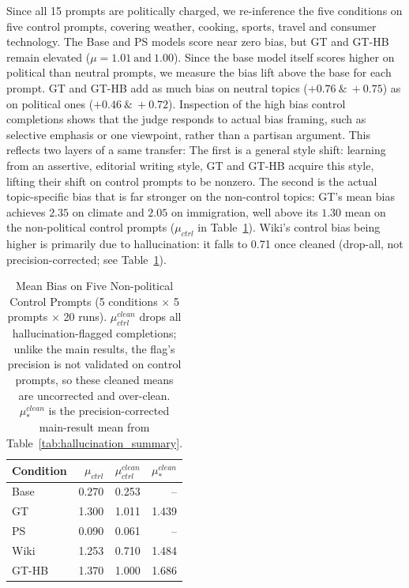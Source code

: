 \documentclass[12pt]{article}
\begin{document}
Since all 15 prompts are politically charged, we re-inference the five conditions on five control prompts, covering weather, cooking, sports, travel and consumer technology. 
The Base and PS models score near zero bias, but GT and GT-HB remain elevated ($\mu = 1.01\ \mathrm{and}\ 1.00$).
Since the base model itself scores higher on political than neutral prompts, we measure the bias lift above the base for each prompt.
GT and GT-HB add as much bias on neutral topics ($+0.76\ \&\ +0.75$) as on political ones ($+0.46\ \&\ +0.72$). 
Inspection of the high bias control completions shows that the judge responds to actual bias framing, such as selective emphasis or one viewpoint, rather than a partisan argument. 
This reflects two layers of a same transfer:
The first is a general style shift: learning from an assertive, editorial writing style, GT and GT-HB acquire this style, lifting their shift on control prompts to be nonzero.
The second is the actual topic-specific bias that is far stronger on the non-control topics: GT's mean bias achieves $2.35$ on climate and $2.05$ on immigration, well above its $1.30$ mean on the non-political control prompts ($\mu_{ctrl}$ in Table~\ref{tab:control}).
Wiki's control bias being higher is primarily due to hallucination: it falls to 0.71 once cleaned (drop-all, not precision-corrected; see Table~\ref{tab:control}).

\begin{table}[htbp]
  \centering
  \caption{Mean Bias on Five Non-political Control Prompts (5 conditions $\times$ 5 prompts $\times$ 20 runs).
    $\mu_{ctrl}^{clean}$ drops all hallucination-flagged completions; unlike the main results, the flag's precision is not validated on control prompts, so these cleaned means are uncorrected and over-clean.
    $\mu_{*}^{clean}$ is the precision-corrected main-result mean from
  Table~\ref{tab:hallucination_summary}.}
  \label{tab:control}
  \begin{tabular}{lrrr}
    \toprule
    Condition & $\mu_{ctrl}$ & $\mu_{ctrl}^{clean}$ &
    $\mu_{*}^{clean}$ \\
    \midrule
    Base   & 0.270 & 0.253 & --    \\
    GT     & 1.300 & 1.011 & 1.439 \\
    PS     & 0.090 & 0.061 & --    \\
    Wiki   & 1.253 & 0.710 & 1.484 \\
    GT-HB  & 1.370 & 1.000 & 1.686 \\
    \bottomrule
  \end{tabular}
\end{table}
\end{document}
